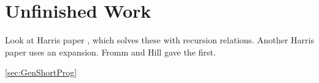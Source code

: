\documentclass[Dissertation.tex]{subfiles}
\begin{document}

\chapter{Unfinished Work}
\label{chp:Unfinished}

Look at Harris paper \cite{Harris2009}, which solves these with recursion relations.
Another Harris paper \cite{Harris2003} uses an expansion.
Fromm and Hill \cite{Fromm1987} gave the first.

\cite{Harris2009,Harris2005a}

\cref{sec:GenShortProg}

\label{sec:PrimeFactor}


\biblio
\end{document}
